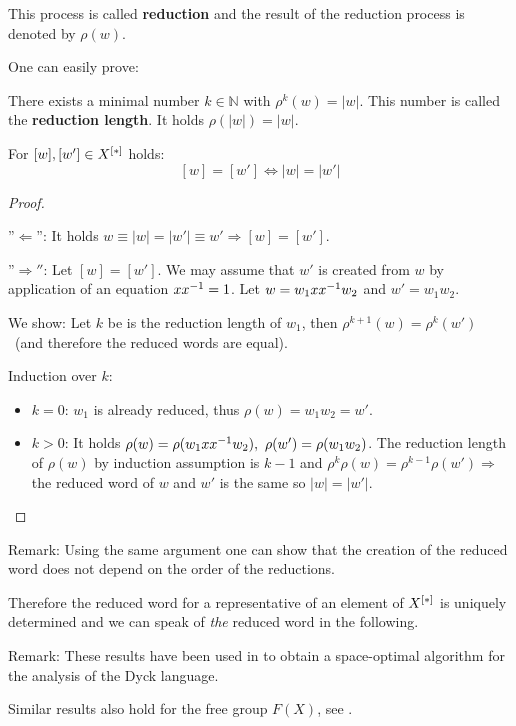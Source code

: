 This process is called {\bf reduction} and the result of the reduction process
is denoted by $\rho(w)$.

One can easily prove:

\begin{lemma}
There exists a minimal number $k \in \mathbb{N}$ with $\rho^k(w) = |w|$. This
number is called the {\bf reduction length}. It holds $\rho(|w|) = |w|$.
\end{lemma}

\bigskip
\begin{lemma}
For $[w], [w'] \in \mbox{${X}^{[*]}$}$ holds:
\[ [w] = [w'] \iff |w| = |w'| \]
\end{lemma}

\begin{proof}\ 

''$\Leftarrow$'': It holds $w \equiv |w| = |w'| \equiv w' \Rightarrow [w] =
[w']$.

''$\Rightarrow''$: Let $[w] = [w']$. We may assume that $w'$ is created from $w$
by application of an equation $x \mbox{${x}^{-1}$} = 1$. Let $w = w_1 x \mbox{${x}^{-1}$} w_2$ and 
$w' = w_1 w_2$.

We show: Let $k$ be is the reduction length of $w_1$, then $\rho^{k+1}(w) =
\rho^k(w')$\ (and therefore the reduced words are equal).

Induction over $k$:
\begin{itemize}
  \item $k = 0$: $w_1$ is already reduced, thus $\rho(w) = w_1 w_2 = w'$.
  \item $k > 0$: It holds $\rho(w) = \rho(w_1 x \inv{x} w_2),\ \rho(w') = \rho(w_1
w_2)$. The reduction length of $\rho(w)$ by induction assumption is $k-1$ and
$\rho^k \rho(w) = \rho^{k-1} \rho(w') \Rightarrow$ the reduced word of $w$ and
$w'$ is the same so $|w| = |w'|$.
\end{itemize}
\end{proof}

Remark: Using the same argument one can show that the creation of the reduced
word does not depend on the order of the reductions. 

Therefore the reduced word for a representative of an element of $\mbox{${X}^{[*]}$}$ is
uniquely determined and we can speak of {\em the} reduced word in the following.

Remark: These results have been used in \cite{HotzMesserschmidt} to obtain a
space-optimal algorithm for the analysis of the Dyck language.

Similar results also hold for the free group $F(X)$, see \cite{CrowellFox}.
